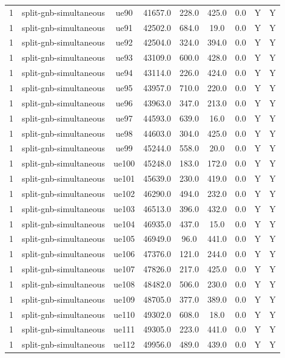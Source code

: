 \begin{table}[ht]
\begin{tabular}{|c|c|c|c|c|c|c|c|c|}
1 & split-gnb-simultaneous & ue90 & 41657.0 & 228.0 & 425.0 & 0.0 & Y & Y \\
1 & split-gnb-simultaneous & ue91 & 42502.0 & 684.0 & 19.0 & 0.0 & Y & Y \\
1 & split-gnb-simultaneous & ue92 & 42504.0 & 324.0 & 394.0 & 0.0 & Y & Y \\
1 & split-gnb-simultaneous & ue93 & 43109.0 & 600.0 & 428.0 & 0.0 & Y & Y \\
1 & split-gnb-simultaneous & ue94 & 43114.0 & 226.0 & 424.0 & 0.0 & Y & Y \\
1 & split-gnb-simultaneous & ue95 & 43957.0 & 710.0 & 220.0 & 0.0 & Y & Y \\
1 & split-gnb-simultaneous & ue96 & 43963.0 & 347.0 & 213.0 & 0.0 & Y & Y \\
1 & split-gnb-simultaneous & ue97 & 44593.0 & 639.0 & 16.0 & 0.0 & Y & Y \\
1 & split-gnb-simultaneous & ue98 & 44603.0 & 304.0 & 425.0 & 0.0 & Y & Y \\
1 & split-gnb-simultaneous & ue99 & 45244.0 & 558.0 & 20.0 & 0.0 & Y & Y \\
1 & split-gnb-simultaneous & ue100 & 45248.0 & 183.0 & 172.0 & 0.0 & Y & Y \\
1 & split-gnb-simultaneous & ue101 & 45639.0 & 230.0 & 419.0 & 0.0 & Y & Y \\
1 & split-gnb-simultaneous & ue102 & 46290.0 & 494.0 & 232.0 & 0.0 & Y & Y \\
1 & split-gnb-simultaneous & ue103 & 46513.0 & 396.0 & 432.0 & 0.0 & Y & Y \\
1 & split-gnb-simultaneous & ue104 & 46935.0 & 437.0 & 15.0 & 0.0 & Y & Y \\
1 & split-gnb-simultaneous & ue105 & 46949.0 & 96.0 & 441.0 & 0.0 & Y & Y \\
1 & split-gnb-simultaneous & ue106 & 47376.0 & 121.0 & 244.0 & 0.0 & Y & Y \\
1 & split-gnb-simultaneous & ue107 & 47826.0 & 217.0 & 425.0 & 0.0 & Y & Y \\
1 & split-gnb-simultaneous & ue108 & 48482.0 & 506.0 & 230.0 & 0.0 & Y & Y \\
1 & split-gnb-simultaneous & ue109 & 48705.0 & 377.0 & 389.0 & 0.0 & Y & Y \\
1 & split-gnb-simultaneous & ue110 & 49302.0 & 608.0 & 18.0 & 0.0 & Y & Y \\
1 & split-gnb-simultaneous & ue111 & 49305.0 & 223.0 & 441.0 & 0.0 & Y & Y \\
1 & split-gnb-simultaneous & ue112 & 49956.0 & 489.0 & 439.0 & 0.0 & Y & Y \\

\end{tabular}
\end{table}
